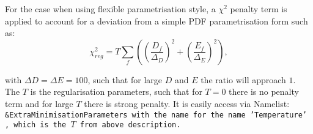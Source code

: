 \begin{description}
For the case when using flexible parametrisation style, 
a $\chi^2$ penalty term is applied to account for a deviation 
from a simple PDF parametrisation form such as:
\begin{equation}
\chi^2_{reg}= T\sum_f\left(\left(\frac{D_f}{\Delta_D}\right)^2+ \left(\frac{E_f}{\Delta_E}\right)^2\right),
\end{equation}

with $\Delta D=\Delta E = 100$, such that for large $D$ and $E$ the ratio will approach $1$. The $T$ is the regularisation parameters, such that for $T=0$ there is no penalty term and for large $T$ there is strong penalty.
It is easily access via Namelist: \tt \&ExtraMinimisationParameters \rm
with the name for the name \tt 'Temperature' \rm, which is the $T$ from above description.

\end{description}

